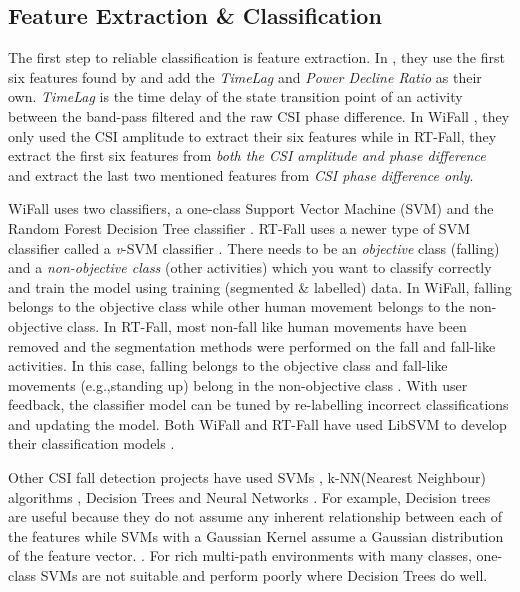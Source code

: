 \subsection{Feature Extraction \& Classification }
The first step to reliable classification is feature extraction. In \cite{RTFall}, they use the first six features found by \cite{WiFall} and add the \textit{TimeLag} and \textit{Power Decline Ratio} as their own. \textit{TimeLag} is the time delay of the state transition point of an activity between the band-pass filtered and the raw CSI phase difference. In WiFall \citep{WiFall}, they only used the CSI amplitude to extract their six features while in RT-Fall, they extract the first six features from \textit{both the CSI amplitude and phase difference} and extract the last two mentioned features from \textit{CSI phase difference only}. \par
WiFall uses two classifiers, a one-class Support Vector Machine (SVM) and the Random Forest Decision Tree classifier \citep{WiFall}. RT-Fall uses a newer type of SVM classifier called a \textit{v}-SVM classifier \citep{newSVM}. There needs to be an \textit{objective} class (falling) and a \textit{non-objective class} (other activities) which you want to classify correctly and train the model using training (segmented \& labelled) data. In WiFall, falling belongs to the objective class while other human movement belongs to the non-objective class. In RT-Fall, most non-fall like human movements have been removed and the segmentation methods were performed on the fall and fall-like activities. In this case, falling belongs to the objective class and fall-like movements (e.g.,standing up) belong in the non-objective class \citep{WiFall,RTFall}. With user feedback, the classifier model can be tuned by re-labelling incorrect classifications and updating the model. Both WiFall and RT-Fall have used LibSVM to develop their classification models \citep{LibSVM}. \par
Other CSI fall detection projects have used SVMs \citep{antiFall}, k-NN(Nearest Neighbour) algorithms \citep{robustdevicefree}, Decision Trees \citep{WiFall,Dayal2016HumanFD} and Neural Networks \citep{Dayal2016HumanFD}. For example, Decision trees are useful because they do not assume any inherent relationship between each of the features while SVMs with a Gaussian Kernel assume a Gaussian distribution of the feature vector. \citep{Dayal2016HumanFD}. For rich multi-path environments with many classes, one-class SVMs are not suitable and perform poorly where Decision Trees do well. \par
